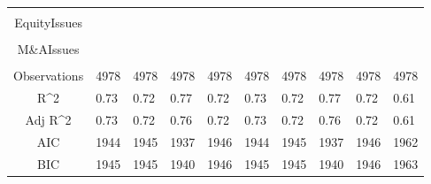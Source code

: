 \documentclass{article}
\begin{document}
\begin{table}[H]
\begin{tabular}{|clllllllll|}
   &  &  &  &  &  &  &  &  &  \\ 
  EquityIssues &  &  &  &  &  &  &  &  &  \\ 
   &  &  &  &  &  &  &  &  &  \\ 
  M\&AIssues &  &  &  &  &  &  &  &  &  \\ 
   &  &  &  &  &  &  &  &  &  \\ 
  \hline 
 Observations & 4978 & 4978 & 4978 & 4978 & 4978 & 4978 & 4978 & 4978 & 4978 \\ 
  R^2 & 0.73 & 0.72 & 0.77 & 0.72 & 0.73 & 0.72 & 0.77 & 0.72 & 0.61 \\ 
  Adj R^2 & 0.73 & 0.72 & 0.76 & 0.72 & 0.73 & 0.72 & 0.76 & 0.72 & 0.61 \\ 
  AIC & 1944 & 1945 & 1937 & 1946 & 1944 & 1945 & 1937 & 1946 & 1962 \\ 
  BIC & 1945 & 1945 & 1940 & 1946 & 1945 & 1945 & 1940 & 1946 & 1963 \\ 
   \hline
\end{tabular}
 
\end{table}
\end{document}
